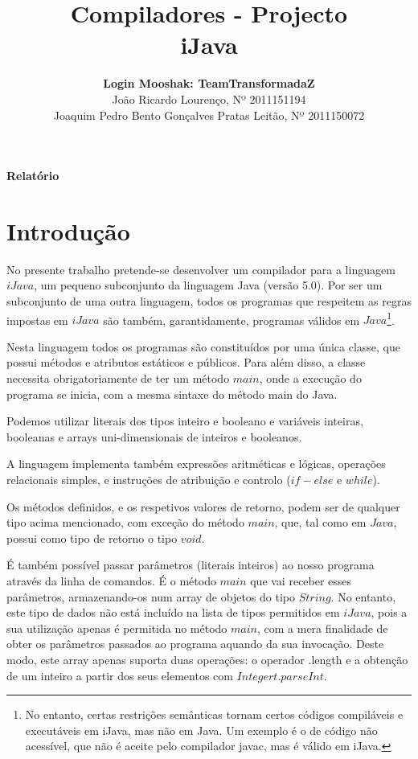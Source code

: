 \documentclass[11pt,a4paper]{article}
\title{\bf{Compiladores - Projecto}\vspace{50mm}\\iJava\vspace{80mm}}
\author{
\textbf{Login Mooshak: TeamTransformadaZ}\\
João Ricardo Lourenço, Nº 2011151194\\
Joaquim Pedro Bento Gonçalves Pratas Leitão, Nº 2011150072}
\begin{document}
\maketitle
\centerline{\textbf{Relatório}}
\pagebreak

\printindex

\renewcommand*\contentsname{Índice}
\tableofcontents

\pagebreak


\section{Introdução}

No presente trabalho pretende-se desenvolver um compilador para a linguagem $iJava$, um pequeno subconjunto da linguagem Java (versão 5.0). Por ser um subconjunto de uma outra linguagem, todos os programas que respeitem as regras impostas em $iJava$ são também, garantidamente, programas válidos em $Java$\footnote{No entanto, certas restrições semânticas tornam certos códigos compiláveis e executáveis em iJava, mas não em Java. Um exemplo é o de código não acessível, que não é aceite pelo compilador javac, mas é válido em iJava.}.

Nesta linguagem todos os programas são constituídos por uma única classe, que possui métodos e atributos estáticos e públicos. Para além disso, a classe necessita obrigatoriamente de ter um método $main$, onde a execução do programa se inicia, com a mesma sintaxe do método main do Java. 

Podemos utilizar literais dos tipos inteiro e booleano e variáveis inteiras, booleanas e arrays uni-dimensionais de inteiros e booleanos.

A linguagem implementa também expressões aritméticas e lógicas, operações relacionais simples, e instruções de atribuição e controlo ($if-else$ e $while$).

Os métodos definidos, e os respetivos valores de retorno, podem ser de qualquer tipo acima mencionado, com exceção do método $main$, que, tal como em $Java$, possui como tipo de retorno o tipo $void$.

É também possível passar parâmetros (literais inteiros) ao nosso programa através da linha de comandos. É o método $main$ que vai receber esses parâmetros, armazenando-os num array de objetos do tipo $String$. No entanto, este tipo de dados não está incluído na lista de tipos permitidos em $iJava$, pois a sua utilização apenas é permitida no método $main$, com a mera finalidade de obter os parâmetros passados ao programa aquando da sua invocação. Deste modo, este array apenas suporta duas operações: o operador .length e a obtenção de um inteiro a partir dos seus elementos com $Integert.parseInt$.
\end{document}
